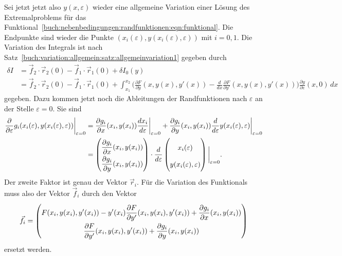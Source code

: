 Sei jetzt jetzt also $y(x,\varepsilon)$ wieder eine allgemeine Variation
einer Lösung des Extremalproblems für das
Funktional~\eqref{buch:nebenbedingungen:randfunktionen:eqn:funktional}.
Die Endpunkte sind wieder die Punkte
$(x_i(\varepsilon),y(x_i(\varepsilon),\varepsilon))$ mit $i=0,1$.
Die Variation des Integrals ist nach
Satz~\ref{buch:variation:allgemein:satz:allgemeinvariation1} 
gegeben durch
\begin{align*}
\delta I
&=
\vec{f}_2\cdot \vec{r}_2(0) - \vec{f}_1\cdot\vec{r}_1(0)
+
\delta I_0(y)
\\
&=
\vec{f}_2\cdot \vec{r}_2(0) - \vec{f}_1\cdot\vec{r}_1(0)
+
\int_{x_1}^{x_2}
\biggl(
\frac{\partial F}{\partial y}(x,y(x),y'(x))
-
\frac{d}{dx}\frac{\partial F}{\partial y'}(x,y(x),y'(x))
\biggr)
\frac{\partial y}{\partial\varepsilon}(x,0)
\,dx
\end{align*}
gegeben.
Dazu kommen jetzt noch die Ableitungen der Randfunktionen nach
$\varepsilon$ an der Stelle $\varepsilon=0$.
Sie sind
\begin{align*}
\frac{\partial}{\partial\varepsilon}
g_i(x_i(\varepsilon),y(x_i(\varepsilon),\varepsilon))
\bigg|_{\varepsilon=0}
&=
\frac{\partial g_i}{\partial x}(x_i,y(x_i))
\frac{d x_i}{d\varepsilon}\bigg|_{\varepsilon=0}
+
\frac{\partial g_i}{\partial y}(x_i,y(x_i))
\frac{d}{d\varepsilon}y(x_i(\varepsilon),\varepsilon)
\bigg|_{\varepsilon=0}
\\
&=
\bgroup
\renewcommand\arraystretch{2}
\begin{pmatrix}
\displaystyle
\frac{\partial g_i}{\partial x}(x_i,y(x_i))
\\
\displaystyle
\frac{\partial g_i}{\partial y}(x_i,y(x_i))
\end{pmatrix}
\egroup
\cdot
\frac{d}{d\varepsilon}
\begin{pmatrix}
x_i(\varepsilon)\\
y(x_i(\varepsilon),\varepsilon)
\end{pmatrix}
\bigg|_{\varepsilon=0}.
\end{align*}
Der zweite Faktor ist genau der Vektor $\vec{r}_i$. 
Für die Variation des Funktionals muss also der Vektor $\vec{f}_i$ durch
den Vektor
\begin{equation}
\vec{f}_i
=
\renewcommand\arraystretch{2}
\begin{pmatrix}
\displaystyle
F(x_i,y(x_i),y'(x_i))
-
y'(x_i) \frac{\partial F}{\partial y'}(x_i,y(x_i),y'(x_i))
+
\frac{\partial g_i}{\partial x}(x_i,y(x_i))
\\
\displaystyle
\frac{\partial F}{\partial y'}(x_i,y(x_i),y'(x_i))
+
\frac{\partial g_i}{\partial y}(x_i,y(x_i))
\end{pmatrix}
\label{buch:nebenbedingungen:randfunktionen:eqn:fnew}
\end{equation}
ersetzt werden.

